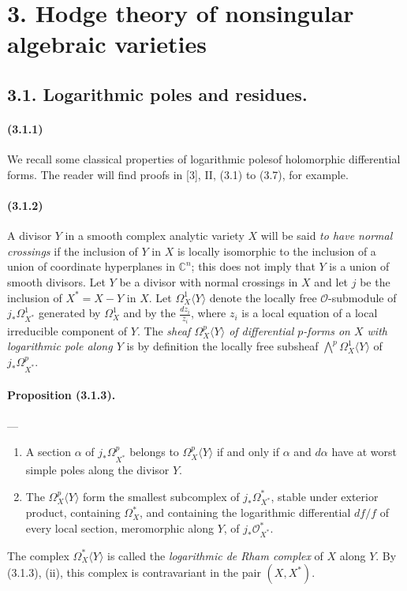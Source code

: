\documentclass[10pt]{article}
\newcommand{\C}{\mathbb C}
\newcommand{\fg}{\guillemotright}
\newcommand{\og}{\guillemotleft}
\providecommand{\cO}{\mathcal O}
\providecommand{\cO}{\mathcal O}
\begin{document}
\section*{3. Hodge theory of nonsingular algebraic varieties}

\subsection*{3.1. Logarithmic poles and residues.}

\paragraph{(3.1.1)} We recall some classical properties of \og logarithmic poles\fg of holomorphic differential forms. The reader will find proofs in [3], II, (3.1) to (3.7), for example.

\paragraph{(3.1.2)} A divisor $Y$ in a smooth complex analytic variety $X$ will be said \emph{to have normal crossings} if the inclusion of $Y$ in $X$ is locally isomorphic to the inclusion of a union of coordinate hyperplanes in $\C^n$; this does not imply that $Y$ is a union of smooth divisors. Let $Y$ be a divisor with normal crossings in $X$ and let $j$ be the inclusion of $X^*=X-Y$ in $X$. Let $\Omega_X^1\langle Y\rangle$ denote the locally free $\cO$-submodule of $j_*\Omega_{X^*}^1$ generated by $\Omega_X^1$ and by the $\frac{dz_i}{z_i}$, where $z_i$ is a local equation of a local irreducible component of $Y$. The \emph{sheaf $\Omega_X^p\langle Y\rangle$ of differential $p$-forms on $X$ with logarithmic pole along $Y$} is by definition the locally free subsheaf $\bigwedge^p\Omega_X^1\langle Y\rangle$ of $j_*\Omega_{X^*}^p$.

\paragraph{Proposition (3.1.3).} --- {\itshape
\begin{enumerate}[label=(\roman*)]
\item A section $\alpha$ of $j_*\Omega_{X^*}^p$ belongs to $\Omega_X^p\langle Y\rangle$ if and only if $\alpha$ and $d\alpha$ have at worst simple poles along the divisor $Y$.
\item The $\Omega_X^p\langle Y\rangle$ form the smallest subcomplex of $j_*\Omega_{X^*}^*$, stable under exterior product, containing $\Omega_X^*$, and containing the logarithmic differential $df/f$ of every local section, meromorphic along $Y$, of $j_*\cO_{X^*}^*$.
\end{enumerate}}
The complex $\Omega_X^*\langle Y\rangle$ is called the \emph{logarithmic de Rham complex} of $X$ along $Y$. By (3.1.3), (ii), this complex is contravariant in the pair $(X,X^*)$.
\end{document}
